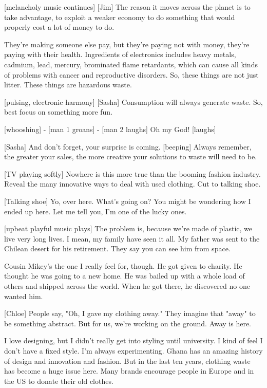 \documentclass[a4paper]{article}
\begin{document}
	
	[melancholy music continues]
	[Jim] The reason it moves across the planet is to take advantage, to exploit a weaker economy to do something that would properly cost a lot of money to do.
	
	
	They're making someone else pay, but they're paying not with money, they're paying with their health.
	Ingredients of electronics includes heavy metals, cadmium, lead, mercury, brominated flame retardants, which can cause all kinds of problems with cancer and reproductive disorders.
	So, these things are not just litter. These things are hazardous waste.
	
	
	[pulsing, electronic harmony]
	[Sasha] Consumption will always generate waste.
	So, best focus on something more fun.
	
	
	[whooshing]
	- [man 1 groans] - [man 2 laughs]
	Oh my God! [laughs]
	
	
	[Sasha] And don't forget, your surprise is coming.
	[beeping]
	Always remember, the greater your sales, the more creative your solutions to waste will need to be.
	
	
	[TV playing softly]
	Nowhere is this more true than the booming fashion industry.
	Reveal the many innovative ways to deal with used clothing.
	Cut to talking shoe.
	
	
	[Talking shoe] Yo, over here.
	What's going on?
	You might be wondering how I ended up here.
	Let me tell you, I'm one of the lucky ones.
	
	
	[upbeat playful music plays]
	The problem is, because we're made of plastic, we live very long lives.
	I mean, my family have seen it all.
	My father was sent to the Chilean desert for his retirement.
	They say you can see him from space.
	
	
	Cousin Mikey's the one I really feel for, though.
	He got given to charity.
	He thought he was going to a new home.
	He was bailed up with a whole load of others and shipped across the world.
	When he got there, he discovered no one wanted him.
	
	
	[Chloe] People say, "Oh, I gave my clothing away."
	They imagine that "away" to be something abstract.
	But for us, we're working on the ground.
	Away is here.
	
	
	I love designing, but I didn't really get into styling until university.
	I kind of feel I don't have a fixed style. I'm always experimenting.
	Ghana has an amazing history of design and innovation and fashion.
	But in the last ten years, clothing waste has become a huge issue here.
	Many brands encourage people in Europe and in the US to donate their old clothes.
	
\end{document}
